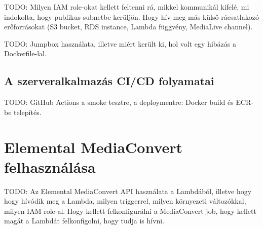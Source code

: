 TODO: Milyen IAM role-okat kellett feltenni rá, mikkel kommunikál kifelé, mi indokolta, hogy publikus subnetbe kerüljön. Hogy hív meg más külső rácsatlakozó erőforrásokat (S3 bucket, RDS instance, Lambda függvény, MediaLive channel).

TODO: Jumpbox használata, illetve miért került ki, hol volt egy hibázás a Dockerfile-lal.

\subsection{A szerveralkalmazás CI/CD folyamatai}

TODO: GitHub Actions a smoke tesztre, a deploymentre: Docker build és ECR-be telepítés.

\section{Elemental MediaConvert felhasználása}

TODO: Az Elemental MediaConvert API használata a Lambdából, illetve hogy hogy hívódik meg a Lambda, milyen triggerrel, milyen környezeti változókkal, milyen IAM role-al. Hogy kellett felkonfigurálni a MediaConvert job, hogy kellett magát a Lambdát felkonfigolni, hogy tudja is hívni.
